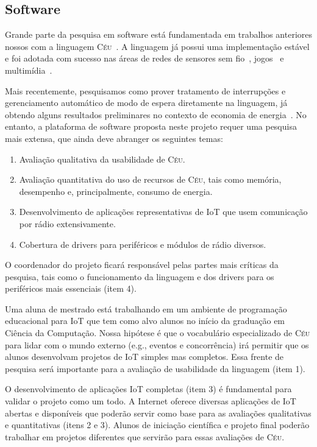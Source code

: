 \documentclass[titlepage,12pt]{article}
\newcommand{\CEU}{\textsc{C\'{e}u}\xspace}
\begin{document}
\subsection{Software}

Grande parte da pesquisa em software está fundamentada em trabalhos anteriores
nossos com a linguagem \CEU~\cite{ceu.sensys13,ceu.tecs17,ceu.lctes18}.
A linguagem já possui uma implementação estável e foi adotada com sucesso nas
áreas de redes de sensores sem fio~\cite{ceu.sensys13,ceu.terra},
jogos~\cite{ceu.mod15} e multimídia~\cite{ceumedia.webmedia16}.

Mais recentemente, pesquisamos como prover tratamento de interrupções e
gerenciamento automático de modo de espera diretamente na linguagem, já obtendo
alguns resultados preliminares no contexto de economia de
energia~\cite{ceu.lctes18.short}.
%
No entanto, a plataforma de software proposta neste projeto requer uma pesquisa
mais extensa, que ainda deve abranger os seguintes temas:
%
\begin{enumerate}
\item Avaliação qualitativa da usabilidade de \CEU.
\item Avaliação quantitativa do uso de recursos de \CEU, tais como memória,
      desempenho e, principalmente, consumo de energia.
\item Desenvolvimento de aplicações representativas de IoT que usem comunicação
      por rádio extensivamente.
\item Cobertura de drivers para periféricos e módulos de rádio diversos.
\end{enumerate}

O coordenador do projeto ficará responsável pelas partes mais críticas da
pesquisa, tais como o funcionamento da linguagem e dos drivers para os
periféricos mais essenciais (item 4).

Uma aluna de mestrado está trabalhando em um ambiente de programação
educacional para IoT que tem como alvo alunos no início da graduação em Ciência
da Computação.
Nossa hipótese é que o vocabulário especializado de \CEU para lidar com o mundo
externo (e.g., eventos e concorrência) irá permitir que os alunos desenvolvam
projetos de IoT simples mas completos.
Essa frente de pesquisa será importante para a avaliação de usabilidade da
linguagem (item 1).

O desenvolvimento de aplicações IoT completas (item 3) é fundamental para
validar o projeto como um todo.
A Internet oferece diversas aplicações de IoT abertas e disponíveis que poderão
servir como base para as avaliações qualitativas e quantitativas (itens 2 e 3).
Alunos de iniciação científica e projeto final poderão trabalhar em projetos
diferentes que servirão para essas avaliações de \CEU.
\end{document}
